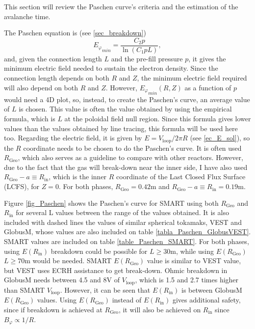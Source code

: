 \documentclass[a4paper,12pt,oneside]{book}
\begin{document}
This section will review the Paschen curve's criteria and the estimation of the avalanche time.

The Paschen equation is (see \ref{sec_breakdown})
%
\begin{equation}
{E_\varphi}_{min}=\dfrac{C_2 p}{\ln(C_1 p L)},
\end{equation}
and, given the connection length $L$ and the pre-fill pressure $p$, it gives the minimum electric field needed to sustain the electron density. Since the connection length depends on both $R$ and $Z$, the minimum electric field required will also depend on both $R$ and $Z$. However, ${E_\varphi}_{min}(R,Z)$ as a function of $p$ would need a 4D plot, so, instead, to create the Paschen's curve, an average value of $L$ is chosen. This value is often the value obtained by using the empirical formula, which is $L$ at the poloidal field null region. Since this formula gives lower values than the values obtained by line tracing, this formula will be used here too. Regarding the electric field, it is given by $E=V_\text{loop}/2 \pi R$ (see \eqref{ec_E_sol}), so the $R$ coordinate needs to be chosen to do the Paschen's curve. It is often used $R_\text{Geo}$, which also serves as a guideline to compare with other reactors. However, due to the fact that the gas will break-down near the inner side, I have also used $R_\text{Geo}-a \equiv R_\text{in}$, which is the inner $R$ coordinate of the Last Closed Flux Surface (LCFS), for $Z=0$. For both phases, $R_\text{Geo}=0.42$m and  $R_\text{Geo}-a \equiv R_\text{in}=0.19$m.

Figure \ref{fig_Paschen} shows the Paschen's curve for SMART using both $R_\text{Geo}$ and $R_\text{in}$ for several L values between the range of the values obtained. It is also included with dashed lines the values of similar spherical tokamaks, VEST and GlobusM, whose values are also included on table  \ref{tabla_Paschen_GlobusVEST}. SMART values are included on table \ref{table_Paschen_SMART}. For both phases, using $E(R_\text{in})$ breakdown could be possible for $L \geq 30$m, while using $E(R_\text{Geo})$ $L \geq 70$m would be needed. SMART $E(R_\text{Geo})$ value is similar to VEST value, but VEST uses ECRH assistance to get break-down. Ohmic breakdown in GlobusM needs between 4.5 and 8V of $V_\text{loop}$, which is 1.5 and 2.7 times higher than SMART $V_\text{loop}$. However, it can be seen that $E(R_\text{in})$ is between GlobusM $E(R_\text{Geo})$ values. Using $E(R_\text{Geo})$ instead of $E(R_\text{in})$ gives additional safety, since if breakdown is achieved at $R_\text{Geo}$, it will also be achieved on $R_\text{in}$ since $B_\varphi \propto 1/R$.
\end{document}
